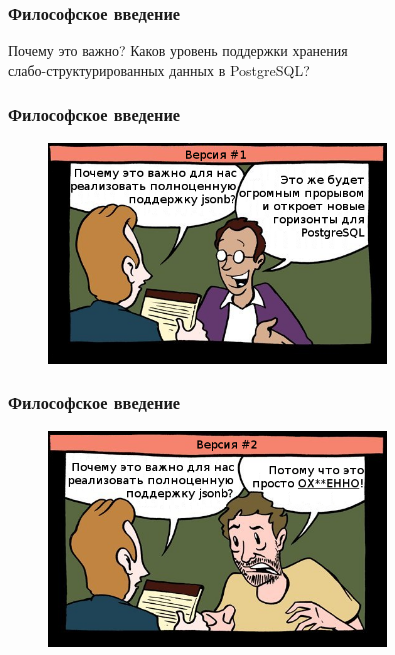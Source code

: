 \documentclass[14pt, compress, aspectratio=169]{beamer}
\begin{document}
\begin{frame}[fragile]
    \frametitle{Философское введение}
    Почему это важно?
    Каков уровень поддержки хранения \\ слабо-структурированных данных в PostgreSQL?
\end{frame}

\begin{frame}
    \frametitle{Философское введение}
    \vspace{-35pt}
    \begin{figure}
        \includegraphics[width=0.8\textwidth,center]{first_option.png}
    \end{figure}
\end{frame}

\begin{frame}
    \frametitle{Философское введение}
    \vspace{-35pt}
    \begin{figure}
        \includegraphics[width=0.8\textwidth,center]{second_option.png}
    \end{figure}
\end{frame}
\end{document}
